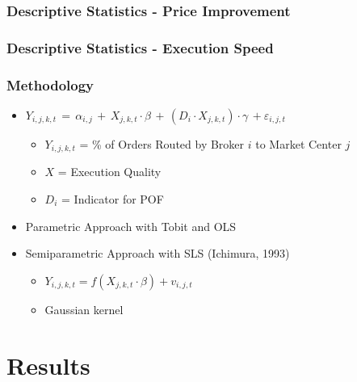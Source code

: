 \documentclass[11pt]{beamer}
\begin{document}
\begin{frame}
\frametitle{Descriptive Statistics - Price Improvement}

\fontsize{6pt}{7}\selectfont


\end{frame}


\begin{frame}
\frametitle{Descriptive Statistics - Execution Speed}

\fontsize{6pt}{7}\selectfont

\end{frame}



\begin{frame}
\frametitle{Methodology}


	\begin{itemize}
		\setlength\itemsep{0.5em}
		\item 	$	Y_{i, j, k,  t} \,=\, \alpha_{i,j} \,+\,  X_{j, k, t} \cdot \beta \,+\,  (D_i \cdot X_{j, k, t}) \cdot \gamma\, +  \varepsilon_{i, j, t}$
		\begin{itemize}
			\setlength\itemsep{0.5em}
			\vspace{0.25em}
			\item $Y_{i, j, k,  t}$ = \% of Orders Routed by Broker $i$ to Market Center $j$
			\item $X$ = Execution Quality
			\item $D_i$ = Indicator for POF
		\end{itemize}
		\vspace{0.5em}
		\item Parametric Approach with Tobit and OLS 
		\item Semiparametric Approach with SLS (Ichimura, 1993)
		\begin{itemize}
			\vspace{0.25em}
			\setlength\itemsep{0.5em}
			\item $Y_{i, j, k, t} = f(X_{j, k, t} \cdot \beta) +  v_{i,j,t}$
			\item Gaussian kernel
		\end{itemize}
	\end{itemize}


\end{frame}




\section{Results}
\end{document}
